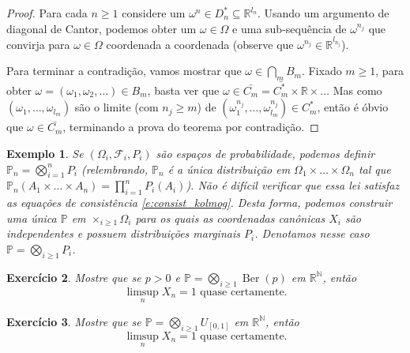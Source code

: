 \documentclass[reqno, draft]{book}
\def\widebar{\bar}
\newcommand*\1{\mathds{1}}
\newtheorem{example}{Exemplo}[section]
\newtheorem{exercise}[example]{Exercício}
\DeclareMathOperator{\Ber}{Ber}
\begin{document}
\begin{proof}
  Para cada $n \geq 1$ considere um $\omega^n \in D_n^* \subseteq \mathbb{R}^{l_n}$.
  Usando um argumento de diagonal de Cantor, podemos obter um $\omega \in \Omega$ e uma sub-sequência de $\omega^{n_j}$ que convirja para $\omega \in \Omega$ coordenada a coordenada (observe que $\omega^{n_j} \in \mathbb{R}^{l_{n_j}}$).

  Para terminar a contradição, vamos mostrar que $\omega \in \bigcap_m B_m$.
  Fixado $m \geq 1$, para obter $\omega = (\omega_1, \omega_2, \dots) \in B_m$, basta ver que $\omega \in \widebar{C_m} = \widebar{C_m^*} \times \mathbb{R} \times \dots$
  Mas como $(\omega_1, \dots, \omega_{l_m})$ são o limite (com $n_j \geq m$) de $(\omega^{n_j}_1, \dots, \omega^{n_j}_{l_m}) \in C_m^*$, então é óbvio que $\omega \in \widebar{C_m}$, terminando a prova do teorema por contradição.
\end{proof}

\begin{example}
  Se $(\Omega_i, \mathcal{F}_i, P_i)$ são espaços de probabilidade, podemos definir $\mathbb{P}_n = \bigotimes_{i=1}^n P_i$ (relembrando, $\mathbb{P}_n$ é a única distribuição em $\Omega_1 \times \dots \times \Omega_n$ tal que $\mathbb{P}_n(A_1 \times \dots \times A_n) = \prod_{i=1}^n P_i(A_i)$).
  Não é difícil verificar que essa lei satisfaz as equações de consistência \eqref{e:consist_kolmog}.
  Desta forma, podemos construir uma única $\mathbb{P}$ em $\times_{i \geq 1} \Omega_i$ para os quais as coordenadas canônicas $X_i$ são independentes e possuem distribuições marginais $P_i$.
  Denotamos nesse caso $\mathbb{P} = \bigotimes_{i \geq 1} P_i$.
\end{example}

\begin{exercise}
  Mostre que se $p > 0$ e $\mathbb{P} = \bigotimes_{i \geq 1} \Ber(p)$ em $\mathbb{R}^\mathbb{N}$, então
  \begin{equation}
    \text{$\limsup_n X_n = 1$ quase certamente.}
  \end{equation}
\end{exercise}

\begin{exercise}
  Mostre que se $\mathbb{P} = \bigotimes_{i \geq 1} U_{[0,1]}$ em $\mathbb{R}^\mathbb{N}$, então
  \begin{equation}
    \text{$\limsup_n X_n = 1$ quase certamente.}
  \end{equation}
\end{exercise}
\end{document}
